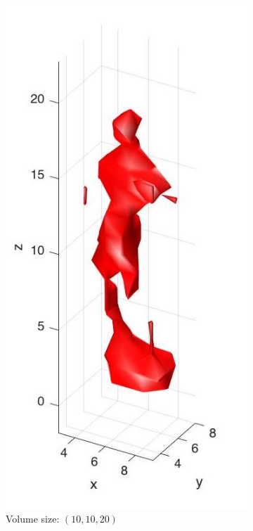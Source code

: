 \documentclass{ethz_report}
\begin{document}
\begin{figure}[H]
\centering
\begin{subfigure}[b]{.5\textwidth}
  \centering
  \includegraphics[width=.8\linewidth]{images/visual_hull_low}
  \caption{Volume size: $(10, 10, 20)$}
\end{subfigure}%
\begin{subfigure}[b]{.5\textwidth}
  \centering

\end{subfigure}
\end{figure}
\end{document}
